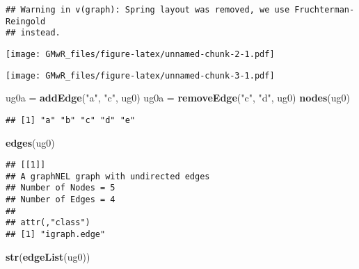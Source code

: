 \documentclass[]{article}
\newenvironment{Shaded}{\begin{snugshade}}{\end{snugshade}}
\newcommand{\KeywordTok}[1]{\textcolor[rgb]{0.13,0.29,0.53}{\textbf{#1}}}
\newcommand{\DataTypeTok}[1]{\textcolor[rgb]{0.13,0.29,0.53}{#1}}
\newcommand{\DecValTok}[1]{\textcolor[rgb]{0.00,0.00,0.81}{#1}}
\newcommand{\StringTok}[1]{\textcolor[rgb]{0.31,0.60,0.02}{#1}}
\newcommand{\CommentTok}[1]{\textcolor[rgb]{0.56,0.35,0.01}{\textit{#1}}}
\newcommand{\ControlFlowTok}[1]{\textcolor[rgb]{0.13,0.29,0.53}{\textbf{#1}}}
\newcommand{\OperatorTok}[1]{\textcolor[rgb]{0.81,0.36,0.00}{\textbf{#1}}}
\newcommand{\NormalTok}[1]{#1}
\begin{document}
\begin{verbatim}
## Warning in v(graph): Spring layout was removed, we use Fruchterman-Reingold
## instead.
\end{verbatim}

\texttt{[image: GMwR\_files/figure-latex/unnamed-chunk-2-1.pdf]}

\begin{Shaded}
\end{Shaded}

\texttt{[image: GMwR\_files/figure-latex/unnamed-chunk-3-1.pdf]}

\begin{Shaded}
\begin{Highlighting}[]
\NormalTok{ug0a =}\StringTok{ }\KeywordTok{addEdge}\NormalTok{(}\StringTok{"a"}\NormalTok{, }\StringTok{"c"}\NormalTok{, ug0)}
\NormalTok{ug0a =}\StringTok{ }\KeywordTok{removeEdge}\NormalTok{(}\StringTok{"c"}\NormalTok{, }\StringTok{"d"}\NormalTok{, ug0)}
\KeywordTok{nodes}\NormalTok{(ug0)}
\end{Highlighting}
\end{Shaded}

\begin{verbatim}
## [1] "a" "b" "c" "d" "e"
\end{verbatim}

\begin{Shaded}
\begin{Highlighting}[]
\KeywordTok{edges}\NormalTok{(ug0)}
\end{Highlighting}
\end{Shaded}

\begin{verbatim}
## [[1]]
## A graphNEL graph with undirected edges
## Number of Nodes = 5 
## Number of Edges = 4 
## 
## attr(,"class")
## [1] "igraph.edge"
\end{verbatim}

\begin{Shaded}
\begin{Highlighting}[]
\KeywordTok{str}\NormalTok{(}\KeywordTok{edgeList}\NormalTok{(ug0))}
\end{Highlighting}
\end{Shaded}
\end{document}
